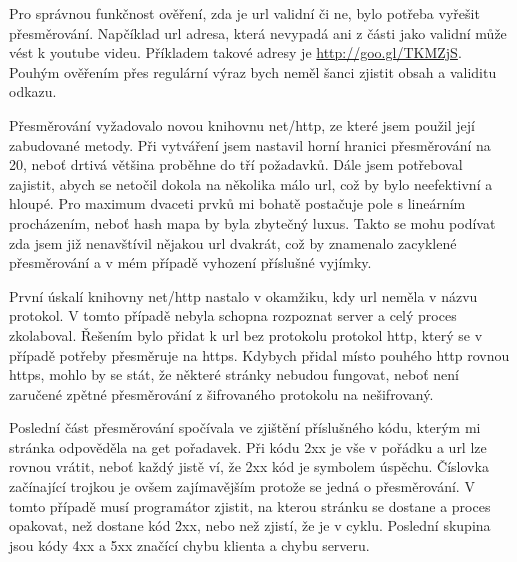 \par Pro správnou funkčnost ověření, zda je url validní či ne, bylo potřeba vyřešit přesměrování. Napčíklad url adresa, která nevypadá ani z části jako validní může vést k youtube videu. Příkladem takové adresy je \url{http://goo.gl/TKMZjS}. Pouhým ověřením přes regulární výraz bych neměl šanci zjistit obsah a validitu odkazu. 
\par Přesměrování vyžadovalo novou knihovnu net/http, ze které jsem použil její zabudované metody. Při vytváření jsem nastavil horní hranici přesměrování na 20, neboť drtivá většina proběhne do tří požadavků. Dále jsem potřeboval zajistit, abych se netočil dokola na několika málo url, což by bylo neefektivní a hloupé. Pro maximum dvaceti prvků mi bohatě postačuje pole s lineárním procházením, neboť hash mapa by byla zbytečný luxus. Takto se mohu podívat zda jsem již nenavštívil nějakou url dvakrát, což by znamenalo zacyklené přesměrování a v mém případě vyhození příslušné vyjímky.
\par První úskalí knihovny net/http nastalo v okamžiku, kdy url neměla v názvu protokol. V tomto případě nebyla schopna rozpoznat server a celý proces zkolaboval. Řešením bylo přidat k url bez protokolu protokol http, který se v případě potřeby přesměruje na https. Kdybych přidal místo pouhého http rovnou https, mohlo by se stát, že některé stránky nebudou fungovat, neboť není zaručené zpětné přesměrování z šifrovaného protokolu na nešifrovaný.
\par Poslední část přesměrování spočívala ve zjištění příslušného kódu, kterým mi stránka odpověděla na get pořadavek. Při kódu 2xx je vše v pořádku a url lze rovnou vrátit, neboť každý jistě ví, že 2xx kód je symbolem úspěchu. Číslovka začínající trojkou je ovšem zajímavějším protože se jedná o přesměrování. V tomto případě musí programátor zjistit, na kterou stránku se dostane a proces opakovat, než dostane kód 2xx, nebo než zjistí, že je v cyklu. Poslední skupina jsou kódy 4xx a 5xx značící chybu klienta a chybu serveru.

